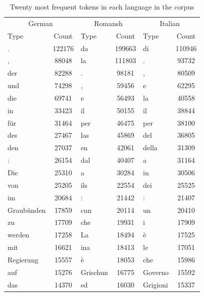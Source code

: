\begin{table}
\centering
\begin{tabular}{lc|lc|lc}
\toprule
\multicolumn{2}{c|}{German} &  \multicolumn{2}{c|}{Romansh} & \multicolumn{2}{c}{Italian} \\
Type & Count & Type & Count & Type & Count\\
\midrule
.	&	122176	&	da	&	199663	&	di	&	110946 \\ 
,	&	88048	&	la	&	111803	&	.	&	93732 \\ 
der	&	82288	&	.	&	98181	&	,	&	80509 \\ 
und	&	74298	&	,	&	59456	&	e	&	62295 \\ 
die	&	69741	&	e	&	56493	&	la	&	40558 \\ 
in	&	33423	&	il	&	50155	&	il	&	38844 \\ 
für	&	31464	&	per	&	46475	&	per	&	38100 \\ 
des	&	27467	&	las	&	45869	&	del	&	36805 \\ 
den	&	27037	&	en	&	42061	&	della	&	31309 \\ 
:	&	26154	&	dal	&	40407	&	a	&	31164 \\ 
Die	&	25310	&	a	&	30284	&	in	&	30506 \\ 
von	&	25205	&	ils	&	22554	&	dei	&	25525 \\ 
im	&	20684	&	:	&	21442	&	:	&	21407 \\ 
Graubünden	&	17859	&	cun	&	20114	&	un	&	20410 \\ 
zu	&	17709	&	che	&	19931	&	i	&	17909 \\ 
werden	&	17258	&	La	&	18494	&	è	&	17525 \\ 
mit	&	16621	&	ina	&	18413	&	le	&	17051 \\ 
Regierung	&	15557	&	è	&	18053	&	che	&	15986 \\ 
auf	&	15276	&	Grischun	&	16775	&	Governo	&	15592 \\ 
das	&	14370	&	ed	&	16030	&	Grigioni	&	15337 \\ 
\bottomrule 
\end{tabular}
\caption{Twenty most frequent tokens in each language in the corpus}
\label{tab:top-20}
\end{table}

